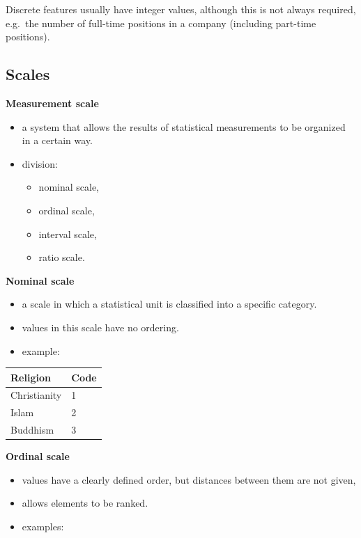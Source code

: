 \documentclass[
  english,
  letterpaper,
  DIV=11,
  numbers=noendperiod]{scrreprt}
\newcounter{none} %
\providecommand{\tightlist}{%
  \setlength{\itemsep}{0pt}\setlength{\parskip}{0pt}}
\begin{document}
Discrete features usually have integer values, although this is not
always required, e.g.~the number of full-time positions in a company
(including part-time positions).

\subsection{Scales}\label{scales}

\textbf{Measurement scale}

\begin{itemize}
\tightlist
\item
  a system that allows the results of statistical measurements to be
  organized in a certain way.
\item
  division:

  \begin{itemize}
  \tightlist
  \item
    nominal scale,
  \item
    ordinal scale,
  \item
    interval scale,
  \item
    ratio scale.
  \end{itemize}
\end{itemize}

\textbf{Nominal scale}

\begin{itemize}
\tightlist
\item
  a scale in which a statistical unit is classified into a specific
  category.
\item
  values in this scale have no ordering.
\item
  example:
\end{itemize}

{\def\LTcaptype{none} %
\begin{longtable}[]{@{}ll@{}}
\toprule\noalign{}
Religion & Code \\
\midrule\noalign{}
\endhead
\bottomrule\noalign{}
\endlastfoot
Christianity & 1 \\
Islam & 2 \\
Buddhism & 3 \\
\end{longtable}
}

\textbf{Ordinal scale}

\begin{itemize}
\tightlist
\item
  values have a clearly defined order, but distances between them are
  not given,
\item
  allows elements to be ranked.
\item
  examples:
\end{itemize}
\end{document}
